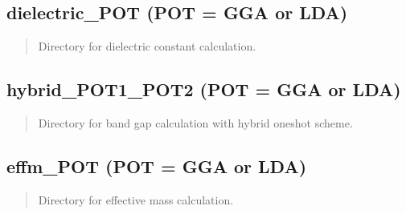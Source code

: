 \documentclass[letterpaper,10pt,english]{sphinxmanual}
\begin{document}
\subsection{dielectric\_POT (POT = GGA or LDA)}
\label{\detokenize{Output/Output:dielectric-pot-pot-gga-or-lda}}\begin{quote}

Directory for dielectric constant calculation.
\end{quote}


\subsection{hybrid\_POT1\_POT2 (POT = GGA or LDA)}
\label{\detokenize{Output/Output:hybrid-pot1-pot2-pot-gga-or-lda}}\begin{quote}

Directory for band gap calculation with hybrid oneshot scheme.
\end{quote}


\subsection{effm\_POT (POT = GGA or LDA)}
\label{\detokenize{Output/Output:effm-pot-pot-gga-or-lda}}\begin{quote}

Directory for effective mass calculation.
\end{quote}
\end{document}
